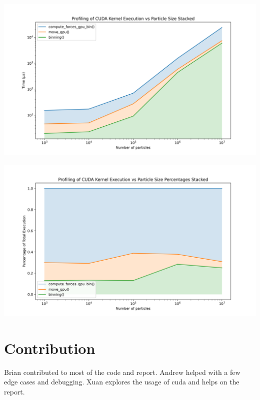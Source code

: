 \documentclass{article}
\begin{document}
\centerline{\includegraphics[width=6in]{figures/profiling-stacked.png}}

\centerline{\includegraphics[width=6in]{figures/profiling-stacked-percentage.png}}


\section{Contribution}
Brian contributed to most of the code and report. Andrew helped with a few edge cases and debugging. Xuan explores the usage of cuda and helps on the report.
\end{document}
